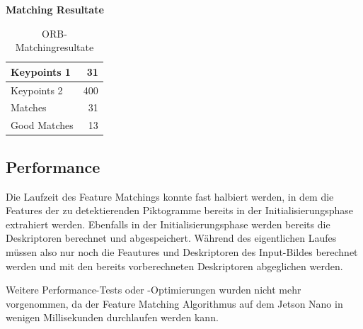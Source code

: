 \textbf{Matching Resultate}
\begin{center}
\begin{table}[H]
\begin{tabular}{|l|r|}
\hline
Keypoints 1 & 31 \\
\hline
Keypoints 2 & 400 \\
\hline
Matches & 31 \\
\hline
Good Matches & 13 \\
\hline
\end{tabular}
\caption[ORB-Matchingresultate]{ORB-Matchingresultate}
\label{tab:orb-matchingresultate}
\end{table}
\end{center}

\newpage

\subsection{Performance}
Die Laufzeit des Feature Matchings konnte fast halbiert werden, in dem die Features der zu detektierenden Piktogramme bereits in der Initialisierungsphase extrahiert werden. Ebenfalls in der Initialisierungsphase werden bereits die Deskriptoren berechnet und abgespeichert. Während des eigentlichen Laufes müssen also nur noch die Feautures und Deskriptoren des Input-Bildes berechnet werden und mit den bereits vorberechneten Deskriptoren abgeglichen werden.

Weitere Performance-Tests oder -Optimierungen wurden nicht mehr vorgenommen, da der Feature Matching Algorithmus auf dem Jetson Nano in wenigen Millisekunden durchlaufen werden kann.  






